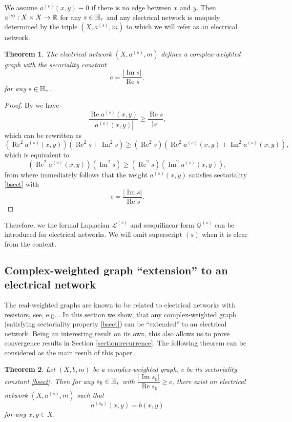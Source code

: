 \documentclass[a4paper,11pt]{amsart}
\newtheorem{theorem}{Theorem}[section]
\theoremstyle{definition}
\renewcommand{\a}{a}%
\renewcommand{\Re}{\operatorname{Re}}%
\renewcommand{\Im}{\operatorname{Im}}%
\renewcommand{\L}{\mathcal{L}}
\newcommand{\cfreq}{s}
\begin{document}
We assume $\a^{(\cfreq)}(x,y)\equiv 0$ if there is no edge between $x$ and $y$. Then $\a^{(\cfreq)}:X\times X\to \Bbb R$ for any $\cfreq \in \Bbb H_r$  and  any electrical network is uniquely determined by the triple $(X,\a^{(\cfreq)},m)$ to which we  will refer as an electrical network.

\begin{theorem}\label{thm:ImsRes}
The electrical network  $(X,\a^{(\cfreq)},m)$ defines a complex-weighted graph with the secoriality constant
$$
c=\dfrac{|\Im \cfreq|}{\Re \cfreq},
$$
for any $\cfreq\in\Bbb H_r$.
\end{theorem}
\begin{proof}
By \cite[Lemma 4]{Muranova3} we have
$$
\dfrac{\Re \a^{(\cfreq)}(x,y)}{|\a^{(\cfreq)}(x,y)|}\ge  \dfrac{\Re \cfreq}{|\cfreq|},
$$
which can be rewritten as
$$
{(\Re^2 \a^{(\cfreq)}(x,y))}{(\Re^2\cfreq+\Im^2 \cfreq)}\ge {(\Re^2 \cfreq)}{(\Re^2\a^{(\cfreq)}(x,y)+\Im^2 \a^{(\cfreq)}(x,y))},
$$
which is equivalent to
$$
{(\Re^2 \a^{(\cfreq)}(x,y))}{(\Im^2 \cfreq)}\ge {(\Re^2 \cfreq)}{(\Im^2 \a^{(\cfreq)}(x,y))},
$$
from where immediately follows that the weight $ \a^{(\cfreq)}(x,y)$ satisfies sectoriality  \eqref{bsect} with
$$
c = \dfrac{|\Im \cfreq|}{\Re \cfreq}.
$$
\end{proof}

Therefore, we the  formal Laplacian $\L^{(\cfreq)}$ and sesquilinear form $\mathcal Q^{(\cfreq)}$ can be introduced for electrical networks. We will omit superscript $(\cfreq)$ when it is clear from the context.



\subsection{Complex-weighted graph ``extension'' to an electrical network}
The real-weighted graphs are known to be related to electrical networks with resistors, see, e.g. \cite{DoyleSnell}. In this section we show, that any complex-weighted graph (satisfying sectoriality property \eqref{bsect}) can be ``extended'' to an electrical network. Being an interesting result on its own, this also allows us to prove convergence results in Section \ref{section:recurrence}. The following theorem can be considered as the main result of this paper. 
\begin{theorem}\label{thm::main}
Let $(X,b,m)$ be a complex-weighted graph, $c$ be its sectoriality constant \eqref{bsect}.
Then for any $\cfreq_0\in \Bbb H_r$ with $\dfrac{|\Im \cfreq_0|}{\Re \cfreq_0}\ge c$, there exist  an electrical network  $(X,a^{(\cfreq)},m)$ such that 
$$
a^{(\cfreq_0)}(x,y)=b(x,y)
$$
for any $x,y\in X$.
\end{theorem}
\end{document}
